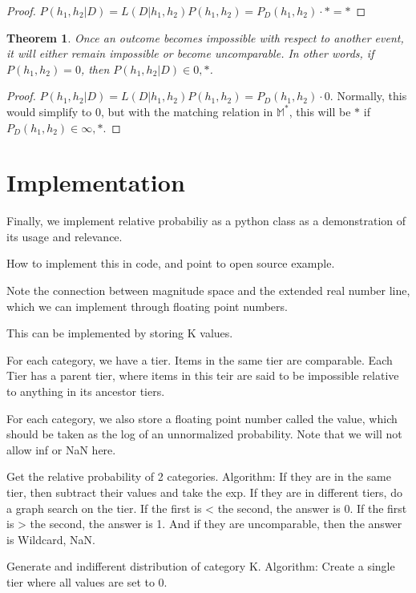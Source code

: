\documentclass[twoside]{article}
\theoremstyle{plain}%
\newtheorem{theorem}{Theorem}[section]
\theoremstyle{definition}
\theoremstyle{remark}
\begin{document}
\begin{proof}
\(P(h_1, h_2|D) = L(D|h_1, h_2) P(h_1, h_2) = P_D(h_1, h_2) \cdot \ast = \ast\)
\end{proof}

\begin{theorem}
Once an outcome becomes impossible with respect to another event, it will either remain impossible or become uncomparable. In other words,  if \(P(h_1, h_2)=0\), then \(P(h_1, h_2|D) \in {0, \ast}\).
\end{theorem}

\begin{proof}
\(P(h_1, h_2|D) = L(D|h_1, h_2) P(h_1, h_2) = P_D(h_1, h_2) \cdot 0\). Normally, this would simplify to 0, but with the matching relation in \(\mathbb{M}^*\), this will be \(\ast\) if \(P_D(h_1, h_2) \in {\infty, \ast}\).
\end{proof}

\section{Implementation}

Finally, we implement relative probabiliy as a python class as a demonstration of its usage and relevance.

How to implement this in code, and point to open source example.

Note the connection between magnitude space and the extended real number line, which we can implement through floating point numbers.

This can be implemented by storing K values.

For each category, we have a tier. Items in the same tier are comparable. Each Tier has a parent tier, where items in this teir are said to be impossible relative to anything in its ancestor tiers.

For each category, we also store a floating point number called the value, which should be taken as the log of an unnormalized probability. Note that we will not allow inf or NaN here.

Get the relative probability of 2 categories. Algorithm: If they are in the same tier, then subtract their values and take the exp. If they are in different tiers, do a graph search on the tier. If the first is < the second, the answer is 0. If the first is > the second, the answer is 1. And if they are uncomparable, then the answer is Wildcard, NaN.

Generate and indifferent distribution of category K. Algorithm: Create a single tier where all values are set to 0.
\end{document}
